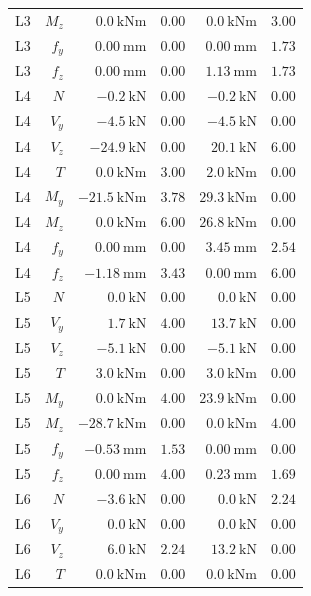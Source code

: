 \documentclass[11pt,a4paper]{article}
\begin{document}
\begin{longtable}{rrrrrr}
L3 & $M_z$ & $0.0\ \mathrm{kNm}$ & $0.00$ & $0.0\ \mathrm{kNm}$ & $3.00$ \\
L3 & $f_y$ & $0.00\ \mathrm{mm}$ & $0.00$ & $0.00\ \mathrm{mm}$ & $1.73$ \\
L3 & $f_z$ & $0.00\ \mathrm{mm}$ & $0.00$ & $1.13\ \mathrm{mm}$ & $1.73$ \\
L4 & $N$ & $-0.2\ \mathrm{kN}$ & $0.00$ & $-0.2\ \mathrm{kN}$ & $0.00$ \\
L4 & $V_y$ & $-4.5\ \mathrm{kN}$ & $0.00$ & $-4.5\ \mathrm{kN}$ & $0.00$ \\
L4 & $V_z$ & $-24.9\ \mathrm{kN}$ & $0.00$ & $20.1\ \mathrm{kN}$ & $6.00$ \\
L4 & $T$ & $0.0\ \mathrm{kNm}$ & $3.00$ & $2.0\ \mathrm{kNm}$ & $0.00$ \\
L4 & $M_y$ & $-21.5\ \mathrm{kNm}$ & $3.78$ & $29.3\ \mathrm{kNm}$ & $0.00$ \\
L4 & $M_z$ & $0.0\ \mathrm{kNm}$ & $6.00$ & $26.8\ \mathrm{kNm}$ & $0.00$ \\
L4 & $f_y$ & $0.00\ \mathrm{mm}$ & $0.00$ & $3.45\ \mathrm{mm}$ & $2.54$ \\
L4 & $f_z$ & $-1.18\ \mathrm{mm}$ & $3.43$ & $0.00\ \mathrm{mm}$ & $6.00$ \\
L5 & $N$ & $0.0\ \mathrm{kN}$ & $0.00$ & $0.0\ \mathrm{kN}$ & $0.00$ \\
L5 & $V_y$ & $1.7\ \mathrm{kN}$ & $4.00$ & $13.7\ \mathrm{kN}$ & $0.00$ \\
L5 & $V_z$ & $-5.1\ \mathrm{kN}$ & $0.00$ & $-5.1\ \mathrm{kN}$ & $0.00$ \\
L5 & $T$ & $3.0\ \mathrm{kNm}$ & $0.00$ & $3.0\ \mathrm{kNm}$ & $0.00$ \\
L5 & $M_y$ & $0.0\ \mathrm{kNm}$ & $4.00$ & $23.9\ \mathrm{kNm}$ & $0.00$ \\
L5 & $M_z$ & $-28.7\ \mathrm{kNm}$ & $0.00$ & $0.0\ \mathrm{kNm}$ & $4.00$ \\
L5 & $f_y$ & $-0.53\ \mathrm{mm}$ & $1.53$ & $0.00\ \mathrm{mm}$ & $0.00$ \\
L5 & $f_z$ & $0.00\ \mathrm{mm}$ & $4.00$ & $0.23\ \mathrm{mm}$ & $1.69$ \\
L6 & $N$ & $-3.6\ \mathrm{kN}$ & $0.00$ & $0.0\ \mathrm{kN}$ & $2.24$ \\
L6 & $V_y$ & $0.0\ \mathrm{kN}$ & $0.00$ & $0.0\ \mathrm{kN}$ & $0.00$ \\
L6 & $V_z$ & $6.0\ \mathrm{kN}$ & $2.24$ & $13.2\ \mathrm{kN}$ & $0.00$ \\
L6 & $T$ & $0.0\ \mathrm{kNm}$ & $0.00$ & $0.0\ \mathrm{kNm}$ & $0.00$ \\

\end{longtable}
\end{document}
